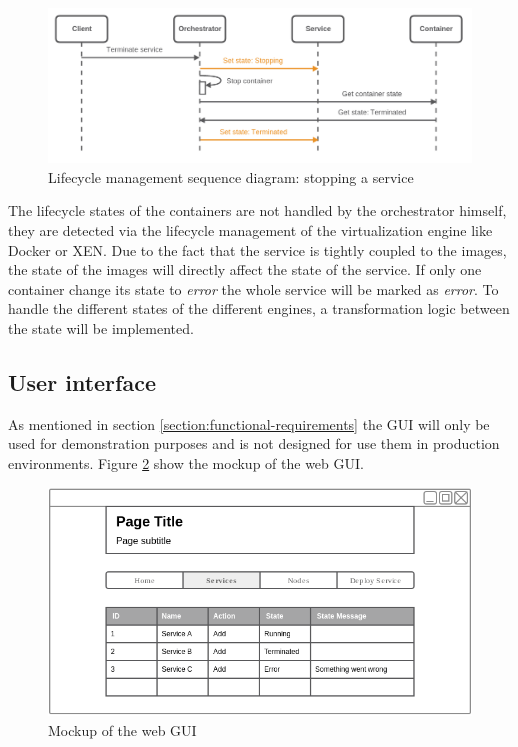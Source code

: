 \begin{figure}[H]
    \centering
    \includegraphics[width=\textwidth]{resources/images/lifecycle_sequence_diagram_stop_service.png}
    \caption[Lifecycle management sequence diagram: stopping a service]{Lifecycle management sequence diagram: stopping a service}
    \label{fig:lifecycle_mgm_squence_diagram_stop_service}
\end{figure}

The lifecycle states of the containers are not handled by the orchestrator himself, they are detected via the lifecycle management of the virtualization engine like Docker or XEN.
Due to the fact that the service is tightly coupled to the images, the state of the images will directly affect the state of the service.
If only one container change its state to \textit{error} the whole service will be marked as \textit{error}.
To handle the different states of the different engines, a transformation logic between the state will be implemented.


\subsection{User interface}
As mentioned in section \ref{section:functional-requirements} the \ac{GUI} will only be used for demonstration purposes and is not designed for use them in production environments.
Figure \ref{fig:gui_mockup} show the mockup of the web \ac{GUI}.

\begin{figure}[H]
    \centering
    \includegraphics[width=\textwidth]{resources/images/gui_prototype.png}
    \caption[Mockup of the web \ac{GUI}]{Mockup of the web \ac{GUI}}
    \label{fig:gui_mockup}
\end{figure}

